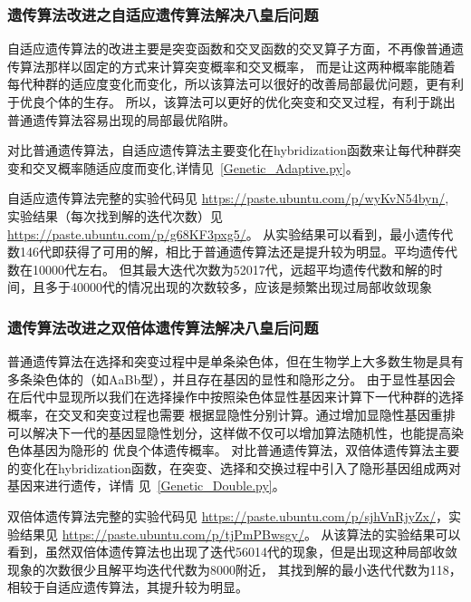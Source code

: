 \documentclass[12pt,a4paper,UTF8]{ctexart}
\begin{document}
\subsubsection{遗传算法改进之自适应遗传算法解决八皇后问题}
自适应遗传算法的改进主要是突变函数和交叉函数的交叉算子方面，不再像普通遗传算法那样以固定的方式来计算突变概率和交叉概率，
而是让这两种概率能随着每代种群的适应度变化而变化，所以该算法可以很好的改善局部最优问题，更有利于优良个体的生存。
所以，该算法可以更好的优化突变和交叉过程，有利于跳出普通遗传算法容易出现的局部最优陷阱。

对比普通遗传算法，自适应遗传算法主要变化在hybridization函数来让每代种群突变和交叉概率随适应度而变化,详情见~\ref{Genetic_Adaptive.py}。

自适应遗传算法完整的实验代码见 \url{https://paste.ubuntu.com/p/wyKvN54byn/},
实验结果（每次找到解的迭代次数）见 \url{https://paste.ubuntu.com/p/g68KF3pxg5/}。
从实验结果可以看到，最小遗传代数146代即获得了可用的解，相比于普通遗传算法还是提升较为明显。平均遗传代数在10000代左右。
但其最大迭代次数为52017代，远超平均遗传代数和解的时间，且多于40000代的情况出现的次数较多，应该是频繁出现过局部收敛现象
\subsubsection{遗传算法改进之双倍体遗传算法解决八皇后问题}
普通遗传算法在选择和突变过程中是单条染色体，但在生物学上大多数生物是具有多条染色体的（如AaBb型），并且存在基因的显性和隐形之分。
由于显性基因会在后代中显现所以我们在选择操作中按照染色体显性基因来计算下一代种群的选择概率，在交叉和突变过程也需要
根据显隐性分别计算。通过增加显隐性基因重排可以解决下一代的基因显隐性划分，这样做不仅可以增加算法随机性，也能提高染色体基因为隐形的
优良个体遗传概率。
对比普通遗传算法，双倍体遗传算法主要的变化在hybridization函数，在突变、选择和交换过程中引入了隐形基因组成两对基因来进行遗传，详情
见~\ref{Genetic_Double.py}。

双倍体遗传算法完整的实验代码见 \url{https://paste.ubuntu.com/p/sjhVnRjyZx/}，实验结果见 \url{https://paste.ubuntu.com/p/tjPmPBwsgy/}。
从该算法的实验结果可以看到，虽然双倍体遗传算法也出现了迭代56014代的现象，但是出现这种局部收敛现象的次数很少且解平均迭代代数为8000附近，
其找到解的最小迭代代数为118，相较于自适应遗传算法，其提升较为明显。
\end{document}
